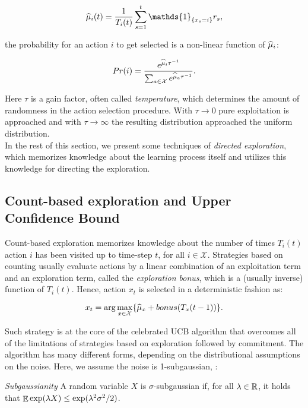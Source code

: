 \begin{equation}
\wh{\mu}_i(t) = \frac{1}{T_i(t)}\sum_{s=1}^{t}\mathds{1}_{\{x_s=i\}}r_s,
\end{equation}

the probability for an action $i$ to get selected is a non-linear function of $\widehat{\mu}_i$:

\begin{equation}
Pr(i) = \frac{e^{\widehat{\mu}_i \tau^{-1}}}{\sum_{a\in\mathcal{X}}e^{\widehat{\mu}_{a}\tau^{-1}}}.
\end{equation}

Here $\tau$ is a gain factor, often called \emph{temperature}, which determines the amount of randomness in the action selection procedure. With $\tau\to 0$ pure exploitation is approached and with $\tau\to \infty$ the resulting distribution approached the uniform distribution. \\
In the rest of this section, we present some techniques of \emph{directed exploration}, which memorizes knowledge about the learning process itself and utilizes this knowledge for directing the exploration.

\subsection{Count-based exploration and Upper Confidence Bound}
Count-based exploration memorizes knowledge about the number of times $T_i(t)$ action $i$ has been visited up to time-step $t$, for all $i\in\mathcal{X}$. Strategies based on counting usually evaluate actions by a linear combination of an exploitation term and an exploration term, called the \emph{exploration bonus}, which is a (usually inverse) function of $T_i(t)$. Hence, action $x_t$ is selected in a deterministic fashion as:

\begin{equation}
x_t = \arg\max_{x\in\mathcal{X}}\{\widehat{\mu}_x + bonus(T_x(t-1))\}.
\end{equation}

Such strategy is at the core of the celebrated \gls{UCB} algorithm \cite{lai1985asymptotically, agrawal1995continuum, auer2002finite} that overcomes all of the limitations of strategies based on exploration followed by commitment. The algorithm has many different forms, depending on the distributional assumptions on the noise. Here, we assume the noise is 1-subgaussian, \ie :

\begin{definition} \label{def:subgaussianity}
\emph{Subgaussianity} A random variable $X$ is $\sigma$-subgaussian if, for all $\lambda\in\mathbb{R}$, it holds that $\mathop{\mathbb{E}}{\exp(\lambda X})\leq\exp(\lambda^2\sigma^2/2)$.
\end{definition}

